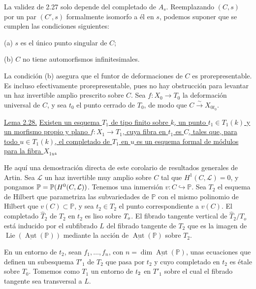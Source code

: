 \pageoriginale

La validez de 2.27 solo depende del completado de $A_s$. Reemplazando $(C,s)$
por un par $(C',s)$ formalmente isomorfo a él en $s$, podemos suponer que se
cumplen las condiciones siguientes:

\medskip
\noindent (a) $s$ es el único punto singular de $C$;

\noindent (b) $C$ no tiene automorfismos infinitesimales.

La condición (b) asegura que el funtor de deformaciones de $C$ es
prorepresentable. Es incluso efectivamente prorepresentable, pues no hay
obstrucción para levantar un haz invertible amplio prescrito sobre $C$. Sea
$f:X_0\longrightarrow T_0$ la deformación universal de $C$, y sea $t_0$ el
punto cerrado de $T_0$, de modo que
$C\overset\sim\longrightarrow X_{0t_0}$.

\medskip
\noindent\underline{Lema 2.28.}
\underline{Existen un esquema $T_1$ de tipo finito sobre $k$, un punto
$t_1\in T_1(k)$ y un morfismo propio y plano $f:X_1\longrightarrow T_1$, cuya
fibra en $t_1$ es $C$, tales que, para todo $u\in T_1(k)$, el completado de
$T_1$ en $u$ es un esquema formal de módulos para la fibra $X_{1u}$.}

He aquí una demostración directa de este corolario de resultados generales de
Artin. Sea $\mathcal L$ un haz invertible muy amplio sobre $C$ tal que
$H^1(C,\mathcal L)=0$, y pongamos
$\mathbb P=\mathbb P(H^{\sisi{o}{0}}(C,\mathcal L))$. Tenemos una inmersión
$v:C\hookrightarrow\mathbb P$. Sea $T_2$ el esquema de Hilbert que parametriza
las subvariedades de $\mathbb P$ con el mismo polinomio de Hilbert que
$v(C)\subset\mathbb P$, y sea $t_2\in T_2$ el punto correspondiente a $v(C)$.
El completado $\widehat T_2$ de $T_2$ en $t_2$ es liso sobre
$\sisi{S_o}{T_o}$. El fibrado tangente vertical de
$\widehat T_2/T_o$ está inducido por el subfibrado $L$ del fibrado tangente de
$T_2$ que es la imagen de
$\operatorname{Lie}(\underline{\operatorname{Aut}}(\mathbb P))$ mediante la
acción de $\underline{\operatorname{Aut}}(\mathbb P)$ sobre $T_2$.

En un entorno de $t_2$, sean $f_1,\ldots,f_n$, con
$n=\dim\underline{\operatorname{Aut}}(\mathbb P)$, unas ecuaciones que definen
un subesquema $T'_1$ de $T_2$ que pasa por $t_2$ y cuyo completado en $t_2$ es
étale sobre $T_0$. Tomemos como $T_1$ un entorno de
$\sisi{t}{t_2}$ en $T'_1$ sobre el cual el fibrado tangente sea transversal a
$L$.

\pageoriginale

